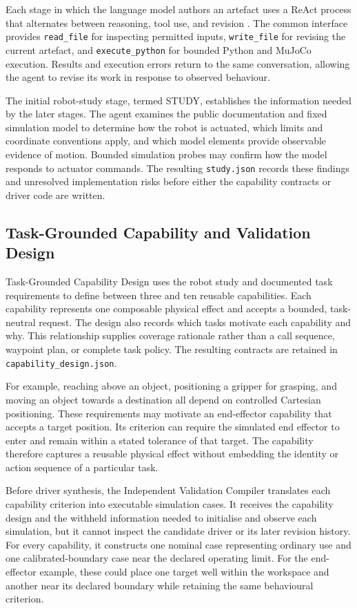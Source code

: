 Each stage in which the language model authors an artefact uses a ReAct process
that alternates between reasoning, tool use, and revision
\citep{yao2023react}. The common interface provides
\texttt{read\_file} for inspecting permitted inputs,
\texttt{write\_file} for revising the current artefact, and
\texttt{execute\_python} for bounded Python and MuJoCo execution. Results and
execution errors return to the same conversation, allowing the agent to revise
its work in response to observed behaviour.

The initial robot-study stage, termed STUDY, establishes the information needed
by the later stages. The agent examines the public documentation and fixed
simulation model to determine how the robot is actuated, which limits and
coordinate conventions apply, and which model elements provide observable
evidence of motion. Bounded simulation probes may confirm how the model
responds to actuator commands. The resulting \texttt{study.json} records these
findings and unresolved implementation risks before either the capability
contracts or driver code are written.

\subsection{Task-Grounded Capability and Validation Design}

Task-Grounded Capability Design uses the robot study and documented task
requirements to define between three and ten reusable capabilities. Each
capability represents one composable physical effect and accepts a bounded,
task-neutral request. The design also records which tasks motivate each
capability and why. This relationship supplies coverage rationale rather than
a call sequence, waypoint plan, or complete task policy. The resulting
contracts are retained in \texttt{capability\_design.json}.

For example, reaching above an object, positioning a gripper for grasping, and
moving an object towards a destination all depend on controlled Cartesian
positioning. These requirements may motivate an end-effector capability that
accepts a target position. Its criterion can require the simulated end
effector to enter and remain within a stated tolerance of that target. The
capability therefore captures a reusable physical effect without embedding the
identity or action sequence of a particular task.

Before driver synthesis, the Independent Validation Compiler translates each
capability criterion into executable simulation cases. It receives the
capability design and the withheld information needed to initialise and
observe each simulation, but it cannot inspect the candidate driver or its
later revision history. For every capability, it constructs one nominal case
representing ordinary use and one calibrated-boundary case near the declared
operating limit. For the end-effector example, these could place one target
well within the workspace and another near its declared boundary while
retaining the same behavioural criterion.

